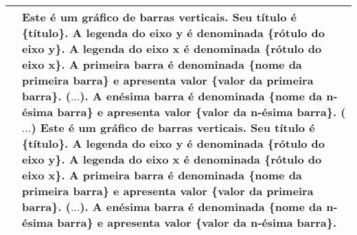 \begin{table}[hbtp]
\begin{tabulary}{1\textwidth}{|C|J|}
     \vspace{1.55cm}{4} & {Este é um gráfico de barras verticais. Seu título é \{título\}. A legenda do eixo y é denominada \{rótulo do eixo y\}. A legenda do eixo x é denominada \{rótulo do eixo x\}. A primeira barra é denominada \{nome da primeira barra\} e apresenta valor \{valor da primeira barra\}. ($\ldots$). A enésima barra é denominada \{nome da n-ésima barra\} e apresenta valor \{valor da n-ésima barra\}. ($\ldots$) Este é um gráfico de barras verticais. Seu título é \{título\}. A legenda do eixo y é denominada \{rótulo do eixo y\}. A legenda do eixo x é denominada \{rótulo do eixo x\}. A primeira barra é denominada \{nome da primeira barra\} e apresenta valor \{valor da primeira barra\}. ($\ldots$). A enésima barra é denominada \{nome da n-ésima barra\} e apresenta valor \{valor da n-ésima barra\}.}\\
   
    \hline
\end{tabulary}

\end{table}
